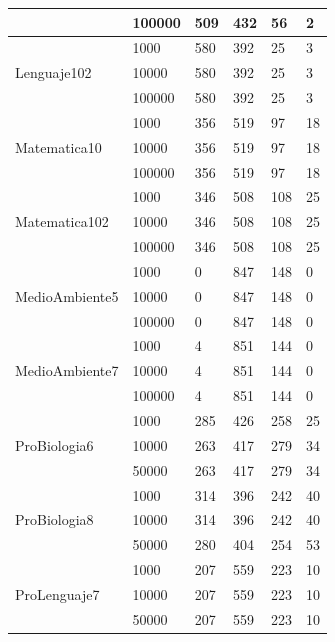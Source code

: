 \begin{longtable}{|p{3cm}|p{3cm}|p{2cm}|p{2cm}|p{2cm}|p{2cm}|}
\cline{2-6}      & 100000 & 509   & 432   & 56    & 2 \\
\hline
\multirow{3}[6]{*}{Lenguaje102} & 1000  & 580   & 392   & 25    & 3 \\
\cline{2-6}      & 10000 & 580   & 392   & 25    & 3 \\
\cline{2-6}      & 100000 & 580   & 392   & 25    & 3 \\
\hline
\multirow{3}[6]{*}{Matematica10} & 1000  & 356   & 519   & 97    & 18 \\
\cline{2-6}      & 10000 & 356   & 519   & 97    & 18 \\
\cline{2-6}      & 100000 & 356   & 519   & 97    & 18 \\
\hline
\multirow{3}[6]{*}{Matematica102} & 1000  & 346   & 508   & 108   & 25 \\
\cline{2-6}      & 10000 & 346   & 508   & 108   & 25 \\
\cline{2-6}      & 100000 & 346   & 508   & 108   & 25 \\
\hline
\multirow{3}[6]{*}{MedioAmbiente5} & 1000  & 0     & 847   & 148   & 0 \\
\cline{2-6}      & 10000 & 0     & 847   & 148   & 0 \\
\cline{2-6}      & 100000 & 0     & 847   & 148   & 0 \\
\hline
\multirow{3}[6]{*}{MedioAmbiente7} & 1000  & 4     & 851   & 144   & 0 \\
\cline{2-6}      & 10000 & 4     & 851   & 144   & 0 \\
\cline{2-6}      & 100000 & 4     & 851   & 144   & 0 \\
\hline
\multirow{3}[6]{*}{ProBiologia6} & 1000  & 285   & 426   & 258   & 25 \\
\cline{2-6}      & 10000 & 263   & 417   & 279   & 34 \\
\cline{2-6}      & 50000 & 263   & 417   & 279   & 34 \\
\hline
\multirow{3}[6]{*}{ProBiologia8} & 1000  & 314   & 396   & 242   & 40 \\
\cline{2-6}      & 10000 & 314   & 396   & 242   & 40 \\
\cline{2-6}      & 50000 & 280   & 404   & 254   & 53 \\
\hline
\multirow{3}[6]{*}{ProLenguaje7} & 1000  & 207   & 559   & 223   & 10 \\
\cline{2-6}      & 10000 & 207   & 559   & 223   & 10 \\
\cline{2-6}      & 50000 & 207   & 559   & 223   & 10 \\

\end{longtable}
